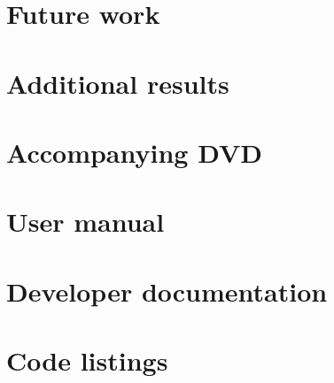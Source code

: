 \documentclass[a4paper,12pt]{report}
\begin{document}
\clearpage
\clearpage
\clearpage


\chapter{Future work}



\newpage


\newpage
\appendix

\chapter{Additional results}


\chapter{Accompanying DVD}


\chapter{User manual}


\chapter{Developer documentation}


\chapter{Code listings}

\end{document}
